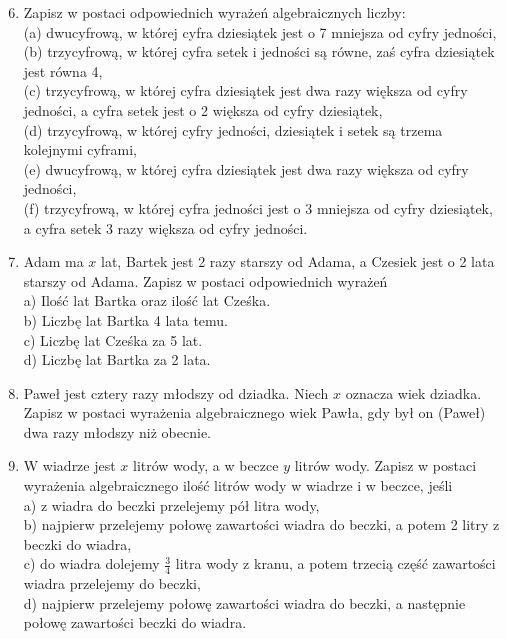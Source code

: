 \documentclass[10pt]{article}
\begin{document}
\begin{enumerate}
  \setcounter{enumi}{5}
  \item Zapisz w postaci odpowiednich wyrażeń algebraicznych liczby:\\
(a) dwucyfrową, w której cyfra dziesiątek jest o 7 mniejsza od cyfry jedności,\\
(b) trzycyfrową, w której cyfra setek i jedności są równe, zaś cyfra dziesiątek jest równa 4,\\
(c) trzycyfrową, w której cyfra dziesiątek jest dwa razy większa od cyfry jedności, a cyfra setek jest o 2 większa od cyfry dziesiątek,\\
(d) trzycyfrową, w której cyfry jedności, dziesiątek i setek są trzema kolejnymi cyframi,\\
(e) dwucyfrową, w której cyfra dziesiątek jest dwa razy większa od cyfry jedności,\\
(f) trzycyfrową, w której cyfra jedności jest o 3 mniejsza od cyfry dziesiątek, a cyfra setek 3 razy większa od cyfry jedności.
  \item Adam ma \(x\) lat, Bartek jest 2 razy starszy od Adama, a Czesiek jest o 2 lata starszy od Adama. Zapisz w postaci odpowiednich wyrażeń\\
a) Ilość lat Bartka oraz ilość lat Cześka.\\
b) Liczbę lat Bartka 4 lata temu.\\
c) Liczbę lat Cześka za 5 lat.\\
d) Liczbę lat Bartka za 2 lata.
  \item Paweł jest cztery razy młodszy od dziadka. Niech \(x\) oznacza wiek dziadka. Zapisz w postaci wyrażenia algebraicznego wiek Pawła, gdy był on (Paweł) dwa razy młodszy niż obecnie.
  \item W wiadrze jest \(x\) litrów wody, a w beczce \(y\) litrów wody. Zapisz w postaci wyrażenia algebraicznego ilość litrów wody w wiadrze i w beczce, jeśli\\
a) z wiadra do beczki przelejemy pół litra wody,\\
b) najpierw przelejemy połowę zawartości wiadra do beczki, a potem 2 litry z beczki do wiadra,\\
c) do wiadra dolejemy \(\frac{3}{4}\) litra wody z kranu, a potem trzecią część zawartości wiadra przelejemy do beczki,\\
d) najpierw przelejemy połowę zawartości wiadra do beczki, a następnie połowę zawartości beczki do wiadra.
\end{enumerate}
\end{document}
